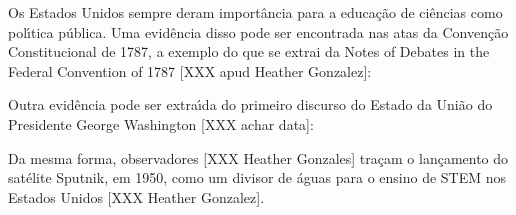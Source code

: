 \documentclass[
12pt,		%
openright,	%
twoside,  %
a4paper,			%
chapter=TITLE,		%
english,			%
french,				%
spanish,			%
brazil				%
]{USPSC-classe/USPSC}
\begin{document}
Os Estados Unidos sempre deram import\^ancia para a educa\c{c}\~ao de ci\^encias como pol\'{\i}tica p\'ublica. Uma evid\^encia disso pode ser encontrada nas atas da Conven\c{c}\~ao Constitucional de 1787, a exemplo do que se extrai da \textquotedbl Notes of Debates in the Federal Convention of 1787 [XXX apud Heather Gonzalez]:















\noindent\begin{center}\mbox{\centering{}}\end{center}


Outra evid\^encia pode ser extra\'{\i}da do primeiro discurso do Estado da Uni\~ao do Presidente George Washington [XXX achar data]:















\noindent\begin{center}\mbox{\centering{}}\end{center}


Da mesma forma, observadores [XXX Heather Gonzales] tra\c{c}am o lan\c{c}amento do sat\'elite Sputnik, em 1950, como um divisor de \'aguas para o ensino de STEM nos Estados Unidos [XXX Heather Gonzalez].
\end{document}
